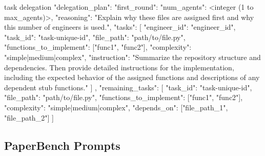 \begin{promptbox}{task delegation}
{
  "delegation_plan": {
    "first_round": {
      "num_agents": <integer (1 to {max_agents})>,
      "reasoning": "Explain why these files are assigned first and why this number of engineers is used.",
      "tasks": [
        {
          "engineer_id": "engineer_id",
          "task_id": "task-unique-id",
          "file_path": "path/to/file.py",
          "functions_to_implement": ["func1", "func2"],
          "complexity": "simple|medium|complex",
          "instruction": "Summarize the repository structure and dependencies. Then provide detailed instructions for the implementation, including the expected behavior of the assigned functions and descriptions of any dependent stub functions."
        }
      ]
    },
    "remaining_tasks": [
      {
        "task_id": "task-unique-id",
        "file_path": "path/to/file.py",
        "functions_to_implement": ["func1", "func2"],
        "complexity": "simple|medium|complex",
        "depends_on": ["file_path_1", "file_path_2"]
      }
    ]
  }
}
\end{promptbox}

\subsection{PaperBench Prompts}
\label{app:paperbench-prompt}

